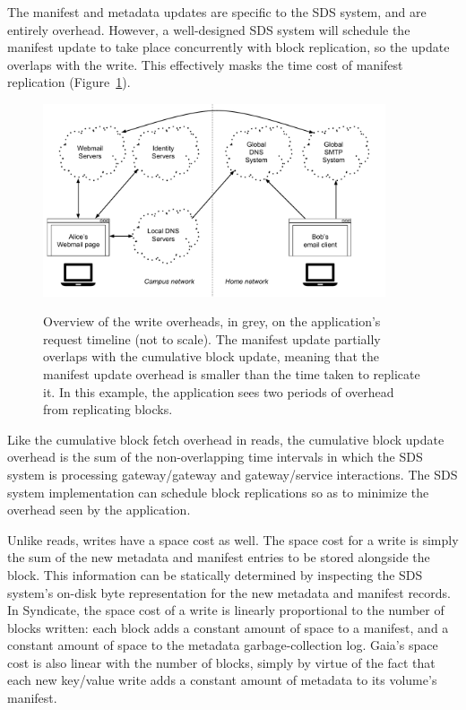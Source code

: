 The manifest and metadata updates are specific to the SDS system, and are
entirely overhead.  However, a well-designed SDS system will schedule the
manifest update to take place concurrently with block replication, so the update
overlaps with the write.  This effectively masks the time cost of manifest
replication (Figure~\ref{fig:evaluation-write-overheads}).

\begin{figure}[h]
   \caption{Overview of the write overheads, in grey, on the application's
request timeline (not to scale).  The manifest update partially overlaps with
the cumulative block update, meaning that the manifest update overhead is
smaller than the time taken to replicate it.  In this example, the application
sees two periods of overhead from replicating blocks.}
   \centering
   \includegraphics[width=0.9\textwidth,page=32]{figures/dissertation-figures}
   \label{fig:evaluation-write-overheads}
\end{figure}

Like the cumulative block fetch overhead in reads, the cumulative block update
overhead is the sum of the non-overlapping time intervals in which the SDS
system is processing gateway/gateway and gateway/service interactions.  The SDS
system implementation can schedule block replications so as to minimize the
overhead seen by the application.

Unlike reads, writes have a space cost as well.  The space cost for a write is
simply the sum of the new metadata and manifest entries to be stored alongside
the block.  This information can be statically determined by inspecting the
SDS system's on-disk byte representation for the new metadata and manifest
records.  In Syndicate, the space cost of a write is linearly
proportional to the number of blocks written:  each block adds a constant amount
of space to a manifest, and a constant amount of space to the metadata
garbage-collection log.  Gaia's space cost is also linear with the number of
blocks, simply by virtue of the fact that each new key/value write adds a constant amount
of metadata to its volume's manifest.

